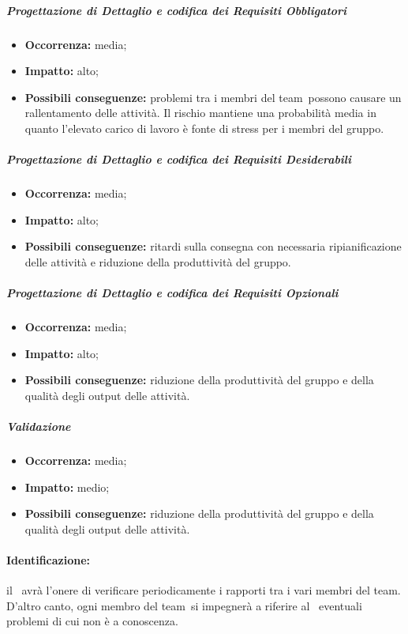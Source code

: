 \documentclass[../PianoProgetto.tex]{subfiles}
\begin{document}
		\subparagraph*{Progettazione di Dettaglio e codifica dei Requisiti Obbligatori}
			\begin{itemize}[label={-}]
				\item \textbf{Occorrenza:} media;
				\item \textbf{Impatto:} alto;
				\item \textbf{Possibili conseguenze:} problemi tra i membri del team\g\ possono causare un rallentamento delle attività. Il rischio mantiene una probabilità media in quanto l'elevato carico di lavoro è fonte di stress per i membri del gruppo. 
			\end{itemize}
			
		\subparagraph*{Progettazione di Dettaglio e codifica dei Requisiti Desiderabili}
			\begin{itemize}[label={-}]
				\item \textbf{Occorrenza:} media;
				\item \textbf{Impatto:} alto;
				\item \textbf{Possibili conseguenze:} ritardi sulla consegna con necessaria ripianificazione delle attività e riduzione della produttività del gruppo.
			\end{itemize}
			
		\subparagraph*{Progettazione di Dettaglio e codifica dei Requisiti Opzionali}
			\begin{itemize}[label={-}]
				\item \textbf{Occorrenza:} media;
				\item \textbf{Impatto:} alto;
				\item \textbf{Possibili conseguenze:} riduzione della produttività del gruppo e della qualità degli output delle attività.
			\end{itemize}
			
		\subparagraph*{Validazione}
			\begin{itemize}[label={-}]
				\item \textbf{Occorrenza:} media;
				\item \textbf{Impatto:} medio;
				\item \textbf{Possibili conseguenze:} riduzione della produttività del gruppo e della qualità degli output delle attività.
			\end{itemize}
	
	\paragraph*{Identificazione:} il \responsabilediprogetto\ avrà l'onere di verificare periodicamente i rapporti tra i vari membri del team\g. D'altro canto, ogni membro del team\g\ si impegnerà a riferire al \responsabilediprogetto\ eventuali problemi di cui non è a conoscenza.
	
\end{document}
